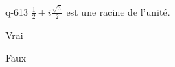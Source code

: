 \begin{truefalse}{q-613}
$\frac{1}{2}+i\frac{\sqrt 3}{2}$ est une racine de l'unité.
\item* Vrai
\item Faux
\end{truefalse}

